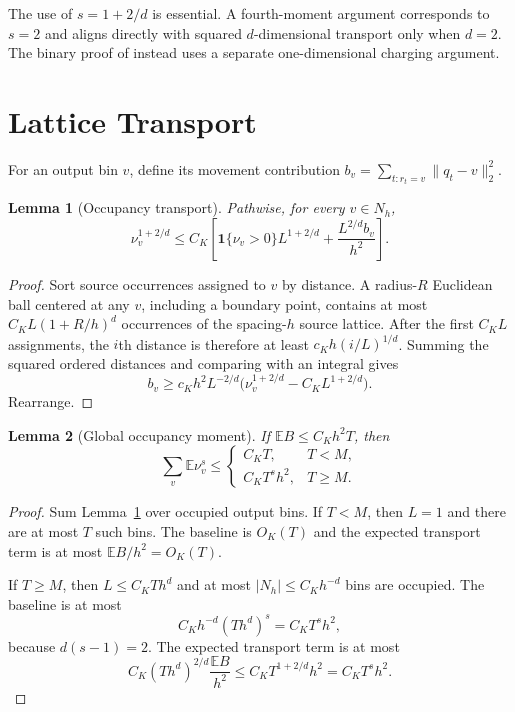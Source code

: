\documentclass[twoside]{article}
\newtheorem{lemma}{Lemma}
\newcommand{\E}{\mathbb E}
\newcommand{\1}{\mathbf 1}
\begin{document}
The use of $s=1+2/d$ is essential. A fourth-moment argument corresponds to $s=2$ and aligns directly with squared $d$-dimensional transport only when $d=2$. The binary proof of \citet{hu2026optimal} instead uses a separate one-dimensional charging argument.

\section{Lattice Transport}

For an output bin $v$, define its movement contribution $b_v=\sum_{t:r_t=v}\|q_t-v\|_2^2$.

\begin{lemma}[Occupancy transport]\label{lem:transport}
Pathwise, for every $v\in N_h$, \[ \nu_v^{1+2/d} \leq C_K\left[ \1\{\nu_v>0\}L^{1+2/d} +\frac{L^{2/d}b_v}{h^2}\right]. \]
\end{lemma}

\begin{proof}
Sort source occurrences assigned to $v$ by distance. A radius-$R$ Euclidean ball centered at any $v$, including a boundary point, contains at most $C_KL(1+R/h)^d$ occurrences of the spacing-$h$ source lattice. After the first $C_KL$ assignments, the $i$th distance is therefore at least $c_Kh(i/L)^{1/d}$. Summing the squared ordered distances and comparing with an integral gives \[ b_v\geq c_Kh^2L^{-2/d} \bigl(\nu_v^{1+2/d}-C_KL^{1+2/d}\bigr). \] Rearrange.
\end{proof}

\begin{lemma}[Global occupancy moment]\label{lem:global}
If $\E B\leq C_Kh^2T$, then \[ \sum_v\E\nu_v^s\leq
 \begin{cases}
 C_KT,&T<M,\\
 C_KT^sh^2,&T\geq M.
 \end{cases}
\]
\end{lemma}

\begin{proof}
Sum Lemma~\ref{lem:transport} over occupied output bins. If $T<M$, then $L=1$ and there are at most $T$ such bins. The baseline is $O_K(T)$ and the expected transport term is at most $\E B/h^2=O_K(T)$.

If $T\geq M$, then $L\leq C_KTh^d$ and at most $|N_h|\leq C_Kh^{-d}$ bins are occupied. The baseline is at most \[ C_Kh^{-d}(Th^d)^s=C_KT^sh^2, \] because $d(s-1)=2$. The expected transport term is at most \[ C_K(Th^d)^{2/d}\frac{\E B}{h^2} \leq C_KT^{1+2/d}h^2=C_KT^sh^2. \]
\end{proof}
\end{document}
